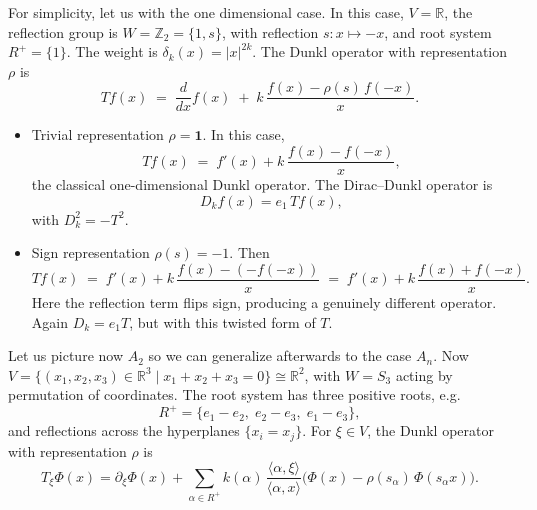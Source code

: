 \documentclass[12pt]{article}
\newcommand{\1}{\mathbbm{1}}
\theoremstyle{definition}
\begin{document}
For simplicity, let us with the one dimensional case. In this case, $V=\mathbb{R}$, the reflection group is $W=\mathbb{Z}_2=\{1,s\}$,
with reflection $s:x\mapsto -x$, and root system $R^+=\{1\}$.
The weight is $\delta_k(x)=|x|^{2k}$.
The Dunkl operator with representation $\rho$ is
\[
  T f(x) \;=\; \frac{d}{dx} f(x)
  \;+\; k\,\frac{f(x)-\rho(s)\,f(-x)}{x}.
\]

\begin{itemize}
\item[(i)] Trivial representation $\rho=\mathbf{1}$.
In this case,
\[
  T f(x) \;=\; f'(x) + k\,\frac{f(x)-f(-x)}{x},
\]
the classical one-dimensional Dunkl operator. The Dirac--Dunkl operator is
\[
  D_k f(x) = e_1\,T f(x),
\]
with $D_k^2 = -T^2$.

\item[(ii)] Sign representation $\rho(s)=-1$.
Then
\[
  T f(x) \;=\; f'(x) + k\,\frac{f(x)-(-f(-x))}{x}
  \;=\; f'(x) + k\,\frac{f(x)+f(-x)}{x}.
\]
Here the reflection term flips sign, producing a genuinely different operator.
Again $D_k = e_1 T$, but with this twisted form of $T$.
\end{itemize}
\noindent
Let us picture now $A_2$ so we can generalize afterwards to the case $A_n$.
Now $V=\{(x_1,x_2,x_3)\in\mathbb{R}^3 \;|\; x_1+x_2+x_3=0\}\cong \mathbb{R}^2$,
with $W=S_3$ acting by permutation of coordinates.
The root system has three positive roots, e.g.
\[
  R^+ = \{e_1-e_2, \; e_2-e_3, \; e_1-e_3\},
\]
and reflections across the hyperplanes
$\{x_i=x_j\}$. For $\xi\in V$, the Dunkl operator with representation $\rho$ is
\[
  T_\xi \Phi(x)
  = \partial_\xi \Phi(x)
  + \sum_{\alpha\in R^+} k(\alpha)\,
    \frac{\langle \alpha,\xi\rangle}{\langle \alpha,x\rangle}
    \big(\Phi(x)-\rho(s_\alpha)\,\Phi(s_\alpha x)\big).
\]
\end{document}
